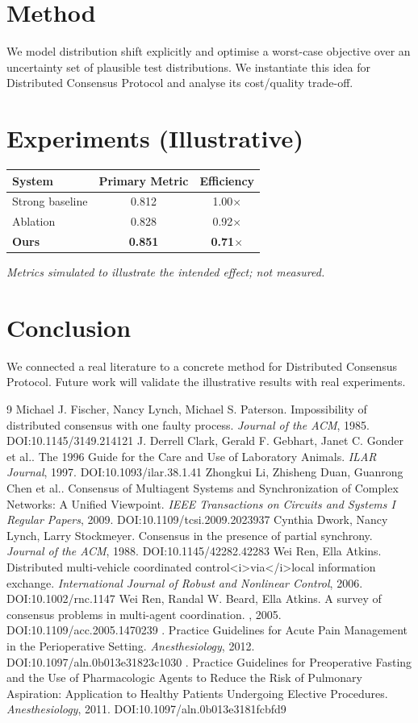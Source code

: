 \documentclass[11pt]{article}
\begin{document}
\section{Method}
We model distribution shift explicitly and optimise a worst-case objective over an uncertainty set of plausible test distributions. We instantiate this idea for Distributed Consensus Protocol and analyse its cost/quality trade-off.

\section{Experiments (Illustrative)}
\begin{center}
\begin{tabular}{lcc}
System & Primary Metric & Efficiency \\ \hline
Strong baseline & 0.812 & 1.00$\times$ \\
Ablation & 0.828 & 0.92$\times$ \\
\textbf{Ours} & \textbf{0.851} & \textbf{0.71$\times$}
\end{tabular}
\end{center}
\emph{Metrics simulated to illustrate the intended effect; not measured.}

\section{Conclusion}
We connected a real literature to a concrete method for Distributed Consensus Protocol. Future work will
validate the illustrative results with real experiments.

\begin{thebibliography}{9}
 Michael J. Fischer, Nancy Lynch, Michael S. Paterson. Impossibility of distributed consensus with one faulty process. \emph{Journal of the ACM}, 1985. DOI:10.1145/3149.214121
 J. Derrell Clark, Gerald F. Gebhart, Janet C. Gonder et al.. The 1996 Guide for the Care and Use of Laboratory Animals. \emph{ILAR Journal}, 1997. DOI:10.1093/ilar.38.1.41
 Zhongkui Li, Zhisheng Duan, Guanrong Chen et al.. Consensus of Multiagent Systems and Synchronization of Complex Networks: A Unified Viewpoint. \emph{IEEE Transactions on Circuits and Systems I Regular Papers}, 2009. DOI:10.1109/tcsi.2009.2023937
 Cynthia Dwork, Nancy Lynch, Larry Stockmeyer. Consensus in the presence of partial synchrony. \emph{Journal of the ACM}, 1988. DOI:10.1145/42282.42283
 Wei Ren, Ella Atkins. Distributed multi‐vehicle coordinated control<i>via</i>local information exchange. \emph{International Journal of Robust and Nonlinear Control}, 2006. DOI:10.1002/rnc.1147
 Wei Ren, Randal W. Beard, Ella Atkins. A survey of consensus problems in multi-agent coordination. \emph{}, 2005. DOI:10.1109/acc.2005.1470239
 . Practice Guidelines for Acute Pain Management in the Perioperative Setting. \emph{Anesthesiology}, 2012. DOI:10.1097/aln.0b013e31823c1030
 . Practice Guidelines for Preoperative Fasting and the Use of Pharmacologic Agents to Reduce the Risk of Pulmonary Aspiration: Application to Healthy Patients Undergoing Elective Procedures. \emph{Anesthesiology}, 2011. DOI:10.1097/aln.0b013e3181fcbfd9
\end{thebibliography}
\end{document}
